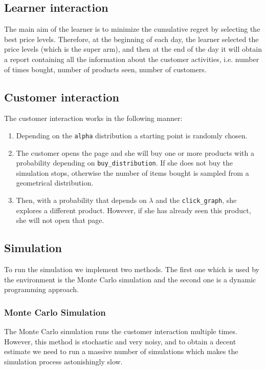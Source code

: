 \subsection{Learner interaction}
The main aim of the learner is to minimize the cumulative regret by selecting the best price levels.
Therefore, at the beginning of each day, the learner selected the price levels (which is the super arm), and then at the end of the day it will obtain a report containing all the information about the customer activities, i.e. number of times bought, number of products seen, number of customers.


\subsection{Customer interaction}
The customer interaction works in the following manner:
\begin{enumerate}
    \item Depending on the \verb|alpha| distribution a starting point is randomly chosen.
    \item The customer opens the page and she will buy one or more products with a probability depending on \verb|buy_distribution|. If she does not buy the simulation stops, otherwise the number of items bought is sampled from a geometrical distribution.
    \item Then, with a probability that depends on \(\lambda\) and the \verb|click_graph|, she explores a different product. However, if she has already seen this product, she will not open that page.
\end{enumerate}

\subsection{Simulation}
To run the simulation we implement two methods. The first one which is used by the environment is the Monte Carlo simulation and the second one is a dynamic programming approach.

\subsubsection{Monte Carlo Simulation}
The Monte Carlo simulation runs the customer interaction multiple times. However, this method is stochastic and very noisy, and to obtain a decent estimate we need to run a massive number of simulations which makes the simulation process astonishingly slow.

